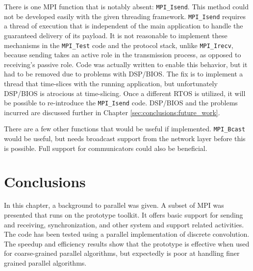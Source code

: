 There is one MPI function that is notably absent: \lstinline$MPI_Isend$. This method could not be developed easily with the given threading framework. \lstinline$MPI_Isend$ requires a thread of execution that is independent of the main application to handle the guaranteed delivery of its payload. It is not reasonable to implement these mechanisms in the \lstinline$MPI_Test$ code and the protocol stack, unlike \lstinline$MPI_Irecv$, because sending takes an active role in the transmission process, as opposed to receiving's passive role. Code was actually written to enable this behavior, but it had to be removed due to problems with DSP/BIOS. The fix is to implement a thread that time-slices with the running application, but unfortunately DSP/BIOS is atrocious at time-slicing. Once a different RTOS is utilized, it will be possible to re-introduce the \lstinline$MPI_Isend$ code. DSP/BIOS and the problems incurred are discussed further in Chapter \ref{sec:conclusions:future_work}.

There are a few other functions that would be useful if implemented. \lstinline$MPI_Bcast$ would be useful, but needs broadcast support from the network layer before this is possible. Full support for communicators could also be beneficial.

\section{Conclusions}\label{sec:api:conclusions}

In this chapter, a background to parallel was given. A subset of MPI was presented that runs on the prototype toolkit. It offers basic support for sending and receiving, synchronization, and other system and support related activities. The code has been tested using a parallel implementation of discrete convolution. The speedup and efficiency results show that the prototype is effective when used for coarse-grained parallel algorithms, but expectedly is poor at handling finer grained parallel algorithms.



